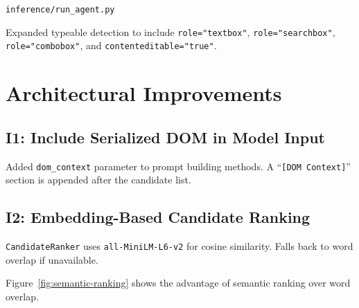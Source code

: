 \documentclass[11pt,a4paper]{article}
\begin{document}
\begin{description}[leftmargin=2cm,style=nextline]
\item[File] \texttt{inference/run\_agent.py}
\item[Fix]
  Expanded typeable detection to include
  \texttt{role="textbox"}, \texttt{role="searchbox"},
  \texttt{role="combobox"}, and \texttt{contenteditable="true"}.
\end{description}


\section{Architectural Improvements}

\subsection{I1: Include Serialized DOM in Model Input}

Added \texttt{dom\_context} parameter to prompt building methods.
A ``\texttt{[DOM Context]}'' section is appended after the candidate
list.

\subsection{I2: Embedding-Based Candidate Ranking}

\texttt{CandidateRanker} uses \texttt{all-MiniLM-L6-v2} for cosine
similarity. Falls back to word overlap if unavailable.

Figure~\ref{fig:semantic-ranking} shows the advantage of semantic
ranking over word overlap.
\end{document}
